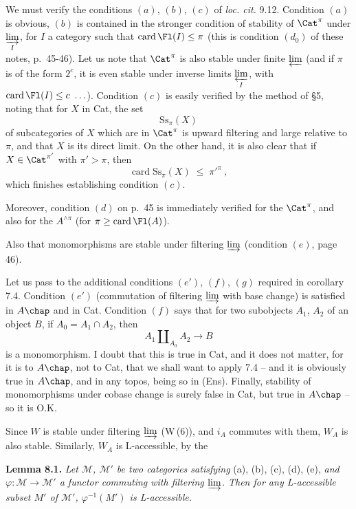We must verify the conditions $(a)$, $(b)$, $(c)$ of \textit{loc. cit.} 9.12. Condition $(a)$ is obvious, $(b)$ is contained in the stronger condition of stability of $\Cat^{\pi}$ under $\varinjlim\limits_{I}$, for $I$ a category such that $\operatorname{card}\Fl(I)\leq\pi$ (this is condition $(d_0)$ of these notes, p.~45-46). Let us note that $\Cat^{\pi}$ is also stable under finite $\varprojlim$ (and if $\pi$ is of the form $2^c$, it is even stable under inverse limits $\varprojlim\limits_{I}$, with $\operatorname{card}\Fl(I)\leq c\ \ldots$). Condition $(c)$ is easily verified by the method of §5, noting that for $X$ in Cat, the set
\[
\mathrm{Ss}_{\pi}(X)
\]
of subcategories of $X$ which are in $\Cat^{\pi}$ is upward filtering and large relative to $\pi$, and that $X$ is its direct limit. On the other hand, it is also clear that if $X\in\Cat^{\pi'}$ with $\pi'>\pi$, then
\[
\operatorname{card}\mathrm{Ss}_{\pi}(X) \;\leq\; \pi'^{\pi}\ ,
\]
which finishes establishing condition $(c)$.

Moreover, condition $(d)$ on p.~45 is immediately verified for the $\Cat^{\pi}$, and also for the $A^{\wedge\pi}$ (for $\pi\geq\operatorname{card}\Fl(A)$).

Also that monomorphisms are stable under filtering $\varinjlim$ (condition $(e)$, page 46).

Let us pass to the additional conditions $(e')$, $(f)$, $(g)$ required in corollary 7.4. Condition $(e')$ (commutation of filtering $\varinjlim$ with base change) is satisfied in $A\chap$ and in Cat. Condition $(f)$ says that for two subobjects $A_1$, $A_2$ of an object $B$, if $A_0=A_1\cap A_2$, then
\[
A_1\amalg_{A_0}A_2 \longrightarrow B
\]
is a monomorphism. I doubt that this is true in Cat, and it does not matter, for it is to $A\chap$, not to Cat, that we shall want to apply 7.4 -- and it is obviously true in $A\chap$, and in any topos, being so in (Ens). Finally, stability of monomorphisms under cobase change is surely false in Cat, but true in $A\chap$ -- so it is O.K.

Since $W$ is stable under filtering $\varinjlim$ (W\,(6)), and $i_A$ commutes with them, $W_A$ is also stable. Similarly, $W_A$ is L-accessible, by the

\textbf{Lemma 8.1.} \textit{Let $\mathcal{M}$, $\mathcal{M}'$ be two categories satisfying} (a), (b), (c), (d), (e), \textit{and $\varphi:\mathcal{M}\longrightarrow\mathcal{M}'$ a functor commuting with filtering $\varinjlim$. Then for any L-accessible subset $M'$ of $\mathcal{M}'$, $\varphi^{-1}(M')$ is L-accessible.}

